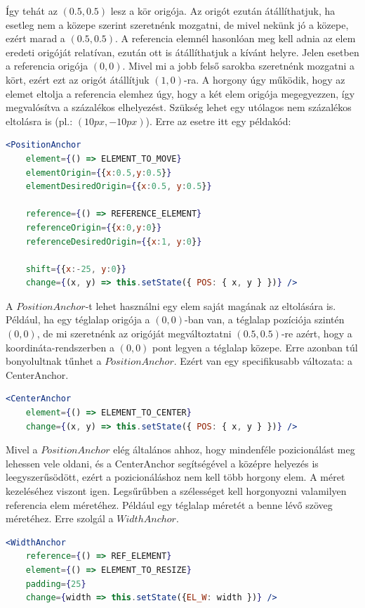 \documentclass[a4paper,12pt,oneside]{report}
\begin{document}
\begin{justify}
	Így tehát az $ (0.5,0.5) $ lesz a kör origója. Az origót ezután átállíthatjuk, ha esetleg nem a közepe szerint szeretnénk mozgatni, de mivel nekünk jó a közepe, ezért marad a $ (0.5,0.5) $. A referencia elemnél hasonlóan meg kell adnia az elem eredeti origóját relatívan, ezután ott is átállíthatjuk a kívánt helyre. Jelen esetben a referencia origója $ (0,0) $. Mivel mi a jobb felső sarokba szeretnénk mozgatni a kört, ezért ezt az origót átállítjuk $(1,0)$-ra. A horgony úgy működik, hogy az elemet eltolja a referencia elemhez úgy, hogy a két elem origója megegyezzen, így megvalósítva a százalékos elhelyezést. Szükség lehet egy utólagos nem százalékos eltolásra is (pl.: $(10px,-10px)$). Erre az esetre itt egy példakód:

	\begin{lstlisting}[language=jsx]
	<PositionAnchor 
	element={() => ELEMENT_TO_MOVE}
	elementOrigin={{x:0.5,y:0.5}}
	elementDesiredOrigin={{x:0.5, y:0.5}}

	reference={() => REFERENCE_ELEMENT}
	referenceOrigin={{x:0,y:0}}
	referenceDesiredOrigin={{x:1, y:0}}

	shift={{x:-25, y:0}}
	change={(x, y) => this.setState({ POS: { x, y } })} />
	\end{lstlisting}

	A $PositionAnchor$-t lehet használni egy elem saját magának az eltolására is. Például, ha egy téglalap origója a $(0,0)$-ban van, a téglalap pozíciója szintén $(0,0)$, de mi szeretnénk az origóját megváltoztatni $(0.5,0.5)$-re azért, hogy a koordináta-rendszerben a $(0,0)$ pont legyen a téglalap közepe. Erre azonban túl bonyolultnak tűnhet a $PositionAnchor$. Ezért van egy specifikusabb változata: a CenterAnchor.

	\begin{lstlisting}[language=jsx]
	<CenterAnchor
	element={() => ELEMENT_TO_CENTER}
	change={(x, y) => this.setState({ POS: { x, y } })} />
	\end{lstlisting}

	Mivel a $PositionAnchor$ elég általános ahhoz, hogy mindenféle pozicionálást meg lehessen vele oldani, és a CenterAnchor segítségével a középre helyezés is leegyszerűsödött, ezért a pozicionáláshoz nem kell több horgony elem. A méret kezeléséhez viszont igen. Legsűrűbben a szélességet kell horgonyozni valamilyen referencia elem méretéhez. Például egy téglalap méretét a benne lévő szöveg méretéhez. Erre szolgál a $WidthAnchor$.

	\begin{lstlisting}[language=jsx]
	<WidthAnchor
	reference={() => REF_ELEMENT}
	element={() => ELEMENT_TO_RESIZE}
	padding={25}
	change={width => this.setState({EL_W: width })} />
	\end{lstlisting}


\end{justify}
\end{document}
